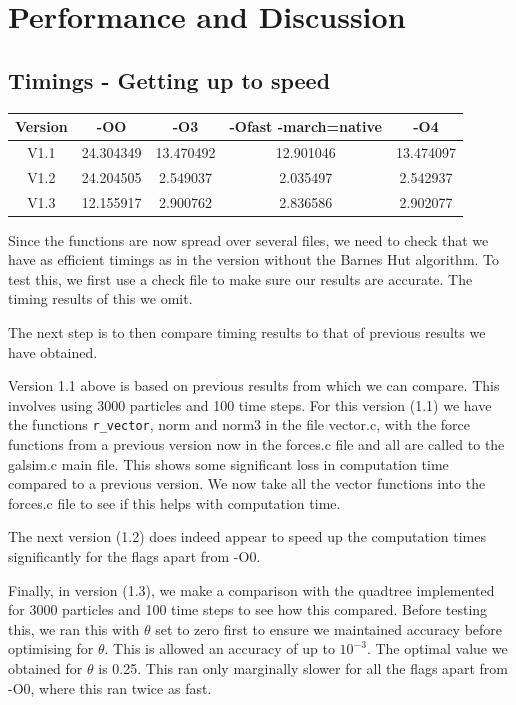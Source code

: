 \section{Performance and Discussion}
\subsection{Timings - Getting up to speed}
\begin{center}
    \begin{tabular}{|c|c|c|c|c|}
        \hline
        Version & -OO & -O3 & -Ofast -march=native & -O4\\
        \hline
        V1.1 & 24.304349 & 13.470492 & 12.901046 & 13.474097\\
        V1.2 & 24.204505 & 2.549037 & 2.035497 & 2.542937\\
        V1.3 & 12.155917 & 2.900762 & 2.836586 & 2.902077\\
        \hline
    \end{tabular}
\end{center}
Since the functions are now spread over several files, we need to check that we have as efficient timings as in the version without the Barnes Hut algorithm. To test this, we first use a check file to make sure our results are accurate. The timing results of this we omit.

The next step is to then compare timing results to that of previous results we have obtained.

Version 1.1 above is based on previous results from which we can compare. This involves using 3000 particles and 100 time steps. For this version (1.1) we have the functions \verb|r_vector|, norm and norm3 in the file vector.c, with the force functions from a previous version now in the forces.c file and all are called to the galsim.c main file. This shows some significant loss in computation time compared to a previous version. We now take all the vector functions into the forces.c file to see if this helps with computation time.

The next version (1.2) does indeed appear to speed up the computation times significantly for the flags apart from -O0.

Finally, in version (1.3), we make a comparison with the quadtree implemented for 3000 particles and 100 time steps to see how this compared. Before testing this, we ran this with $\theta$ set to zero first to ensure we maintained accuracy before optimising for $\theta$. This is allowed an accuracy of up to $10^{-3}$. The optimal value we obtained for $\theta$ is 0.25. This ran only marginally slower for all the flags apart from -O0, where this ran twice as fast.
